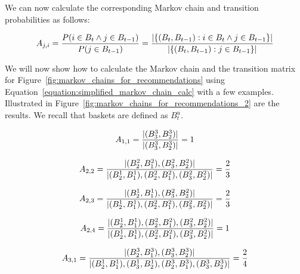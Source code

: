 We can now calculate the corresponding Markov chain and transition probabilities as follows:

\begin{equation}
\setlength{\jot}{25pt}
    A_{j,i}=\frac{P(i\in B_t \wedge j\in B_{t-1})}{P(j\in B_{t-1})}=
    \frac{|\{(B_t,B_{t-1}):i\in B_t \wedge j \in B_{t-1}\}|}
    {|\{(B_t,B_{t-1}):j\in B_{t-1}\}|}
    \label{equation:simplified_markov_chain_calc}
\end{equation}

 We will now show how to calculate the Markov chain and the transition matrix for Figure~\ref{fig:markov_chains_for_recommendations} using Equation~\ref{equation:simplified_markov_chain_calc} with a few examples. Illustrated in Figure~\ref{fig:markov_chains_for_recommendations_2} are the results. We recall that baskets are defined as $B^u_t$.

\begin{equation*}
\setlength{\jot}{25pt}
    A_{1,1}=\frac{|(B^3_3,B^3_2)|
}{|(B^3_3,B^3_2)|}=1
\end{equation*}

\begin{equation*}
\setlength{\jot}{25pt}
    A_{2,2}=\frac{|(B^2_2,B^2_1),(B^2_3,B^2_2)|}{|(B^1_2,B^1_1),(B^2_2,B^2_1),(B^2_3,B^2_2)|}=\frac{2}{3}
\end{equation*}

\begin{equation*}
\setlength{\jot}{25pt}
    A_{2,3}=\frac{|(B^1_2,B^1_1),(B^2_3,B^2_2)|}{|(B^1_2,B^1_1),(B^2_2,B^2_1),(B^2_3,B^2_2)|}=\frac{2}{3}
\end{equation*}

\begin{equation*}
\setlength{\jot}{25pt}
    A_{2,4}=\frac{|(B^1_2,B^1_1),(B^2_2,B^2_1),(B^2_3,B^2_2)|}{|(B^1_2,B^1_1),(B^2_2,B^2_1),(B^2_3,B^2_2)|}=1
\end{equation*}

\begin{equation*}
\setlength{\jot}{25pt}
    A_{3,1}=\frac{|(B^3_2,B^3_1),(B^3_3,B^3_2)|}{|(B^1_2,B^1_1),(B^1_3,B^1_2),(B^3_2,B^3_1),(B^3_3,B^3_2)|}=\frac{2}{4}
\end{equation*}


